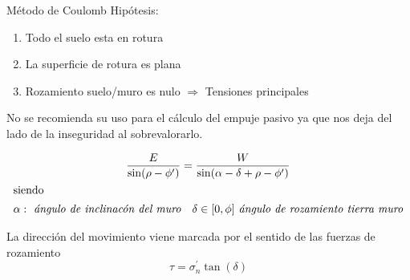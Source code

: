 \begin{mybox}{Método de Coulomb}
	Hipótesis:
	\begin{enumerate}
		\item Todo el suelo esta en rotura
		\item La superficie de rotura es plana
		\item Rozamiento suelo/muro es nulo $\Rightarrow$ Tensiones principales
	\end{enumerate}
	\begin{myrem}
		No se recomienda su uso para el cálculo del empuje pasivo ya que nos deja del lado de la inseguridad al sobrevalorarlo.
	\end{myrem}


	\begin{gather}\label{eq:2.1}
      \frac{E}{\sin(\rho - \phi^\prime )}= \frac{W}{\sin(\alpha - \delta + \rho - \phi^\prime)} \\
      \shortintertext{siendo}
      \begin{aligned}
        &\alpha : \emph{ ángulo de inclinacón del muro}
        & \delta \in [0, \phi] \emph{ ángulo de rozamiento tierra muro}
      \end{aligned}\notag
    \end{gather}
    \begin{myrem}
    	La dirección del movimiento viene marcada por el sentido de las fuerzas de rozamiento
    	\[
    		\tau = \sigma_n^\prime \tan(\delta)
    	\]
    \end{myrem}
\end{mybox}



